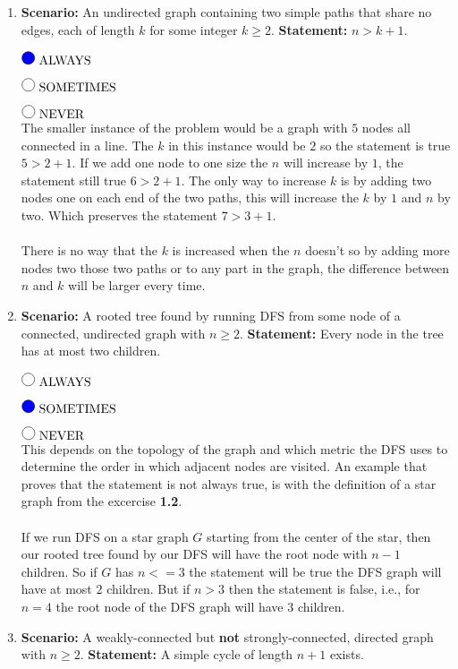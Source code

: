 \documentclass[11pt]{article}
\def\ans#1{{\color{ans}#1}}
\newcommand{\fillinMC}[1]{\fillinMCmath{\mbox{#1}}}
\newcommand{\fillinMCmath}[1]{\begin{tikzpicture}\draw circle [radius=0.5em];\end{tikzpicture}\ #1}
\newcommand{\fillinMCsoln}[1]{\fillinMCmathsoln{\mbox{#1}}}
\newcommand{\fillinMCmathsoln}[1]{\begin{tikzpicture}\draw[black, fill=blue] circle [radius=0.5em];\end{tikzpicture}\ #1}
\begin{document}
\begin{enumerate}
\item \textbf{Scenario:} An undirected graph containing two simple paths that
share no edges, each of length $k$ for some integer $k \geq
   2$. \textbf{Statement:} $n > k+1$.

$\fillinMCsoln{ALWAYS}$

$\fillinMC{SOMETIMES}$

$\fillinMC{NEVER}$\\
\ans{
  The smaller instance of the problem would be a graph with $5$ nodes all connected in a 
  line. The $k$ in this instance would be $2$ so the statement is true $5 > 2 + 1 $. 
  If we add one node to one size the $n$ will increase by $1$, the statement still true 
  $6 > 2 + 1 $. The only way to increase $k$ is by adding two nodes one on each end of 
  the two paths, this will increase the $k$ by $1$ and $n$ by two. Which preserves the 
  statement $7 > 3 + 1$.\\ \\
  There is no way that the $k$ is increased when the $n$ doesn't so by adding more nodes 
  two those two paths or to any part in the graph, the difference between $n$ and $k$ will 
  be larger every time.
}

\item \textbf{Scenario:} A rooted tree found by running DFS from some
node of a connected,
undirected graph with $n \geq 2$. \textbf{Statement:} Every
node in the tree has at most two children.

$\fillinMC{ALWAYS}$

$\fillinMCsoln{SOMETIMES}$

$\fillinMC{NEVER}$ \\
\ans{
  This depends on the topology of the graph and which metric the DFS uses to determine 
  the order in which adjacent nodes are visited. An example that proves that the statement
  is not always true, is with the definition of a star graph from the excercise \textbf{1.2}. \\ \\
  If we run DFS on a star graph $G$ starting from the center of the star, then our rooted tree 
  found by our DFS will have the root node with $n-1$ children. So if $G$ has $n <= 3$ the 
  statement will be true the DFS graph will have at most $2$ children. But if $n > 3$ then 
  the statement is false, i.e., for $n = 4$ the root node of the DFS graph will have $3$ 
  children.
}

\item \textbf{Scenario:} A weakly-connected but \textbf{not} strongly-connected,
directed graph with $n \geq 2$. \textbf{Statement:} A simple cycle of
length $n+1$ exists.


\end{enumerate}
\end{document}
